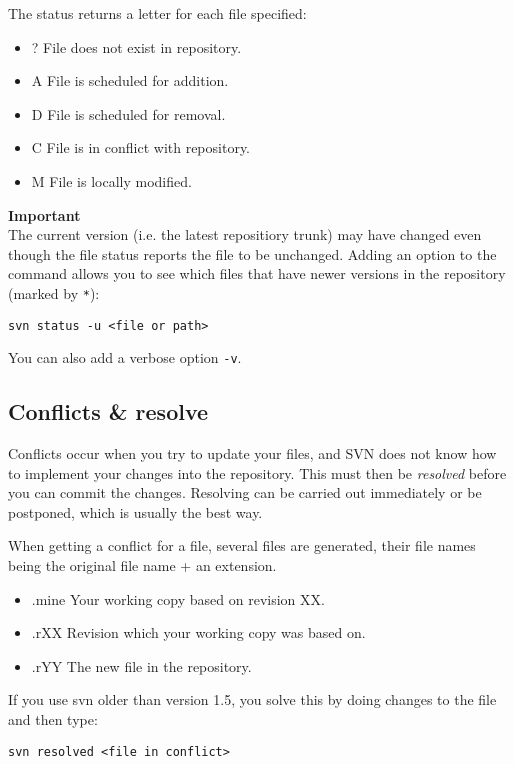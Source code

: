 \documentclass[10pt,a4paper,twocolumn]{article}
\newenvironment{itemize2} {
\begin{itemize}\addtolength{\itemsep}{-0.5\baselineskip}\vspace*{-0.8\baselineskip}
}{\end{itemize} }
\begin{document}
The status returns a letter for each file specified:
\begin{itemize2}
  \item ? File does not exist in repository.
  \item A File is scheduled for addition.
  \item D File is scheduled for removal.
  \item C File is in conflict with repository.
  \item M File is locally modified.
\end{itemize2}

{\bf Important}\\
The current version (i.e. the latest repositiory trunk) may have
changed even though the file status reports the file to be unchanged.
Adding an option to the command allows you to see which
files that have newer versions in the repository (marked by \verb#*#):
{\small
\begin{verbatim}
svn status -u <file or path>
\end{verbatim}
You can also add a verbose option \verb#-v#.
}


\subsection{Conflicts \& resolve}
Conflicts occur when you try to update your files, and SVN does not
know how to implement your changes into the repository.
This must then be {\it resolved} before you can
commit the changes. Resolving can be carried out immediately or be
postponed, which is usually the best way.

When getting a conflict for a file, several files are generated, their
file names being the original file name + an extension.
\begin{itemize}
  \item{.mine} Your working copy based on revision XX.
  \item{.rXX} Revision which your working copy was based on.
  \item{.rYY} The new file in the repository.
\end{itemize}
If you use svn older than version 1.5, you solve this by doing changes
to the file and then type:
{\small
\begin{verbatim}
svn resolved <file in conflict>
\end{verbatim}
}
\end{document}
